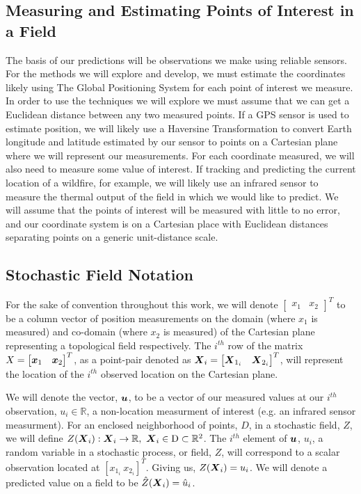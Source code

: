 \documentclass[11pt]{ucthesis}
\newcommand{\vect}[1]{{\it{\boldsymbol{#1}}}}
\begin{document}
\subsection{Measuring and Estimating Points of Interest in a Field}
The basis of our predictions will be observations we make using reliable sensors. For the methods we will explore and develop, we must estimate the coordinates likely using The Global Positioning System for each point of interest we measure. In order to use the techniques we will explore we must assume that we can get a Euclidean distance between any two measured points. If a GPS sensor is used to estimate position, we will likely use a Haversine Transformation to convert Earth longitude and latitude estimated by our sensor to points on a Cartesian plane where we will represent our measurements. For each coordinate measured, we will also need to measure some value of interest. If tracking and predicting the current location of a wildfire, for example, we will likely use an infrared sensor to measure the thermal output of the field in which we would like to predict. We will assume that the points of interest will be measured with little to no error, and our coordinate system is on a Cartesian place with Euclidean distances separating points on a generic unit-distance scale.

\subsection{Stochastic Field Notation}
For the sake of convention throughout this work, we will denote $\begin{bmatrix} x_1 & x_2 \end{bmatrix}^{T}$ to be a column vector of position measurements on the domain (where $x_1$ is measured) and co-domain (where $x_2$ is measured) of the Cartesian plane representing a topological field respectively. The $i^{th}$ row of the matrix $X = \begin{bmatrix} \vect{x}_1 & \vect{x}_2 \end{bmatrix}^{T}$, as a point-pair denoted as $\vect{X}_i = \begin{bmatrix} \vect{X}_{1_i} & \vect{X}_{2_i} \end{bmatrix}^{T}$, will represent the location of the $i^{th}$ observed location on the Cartesian plane.

We will denote the vector, $\vect{u}$, to be a vector of our measured values at our $i^{th}$ observation, $u_i \in \mathbb{R}$, a non-location measurment of interest (e.g. an infrared sensor measurment). For an enclosed neighborhood of points, $D$, in a stochastic field, $Z$, we will define $Z(\vect{X}_i): \vect{X}_i \rightarrow \mathbb{R},\ \vect{X}_i \in \rm{D} \subset \mathbb{R}^2$. The $i^{th}$ element of $\vect{u}$, $u_i$, a random variable in a stochastic process, or field, $Z$, will correspond to a scalar observation located at $[x_{1_i}\ x_{2_i}]^{T}$. Giving us, $Z(\vect{X}_i)=u_i$. We will denote a predicted value on a field to be $\hat{Z}(\vect{X}_i)=\hat{u}_i$.
\end{document}
